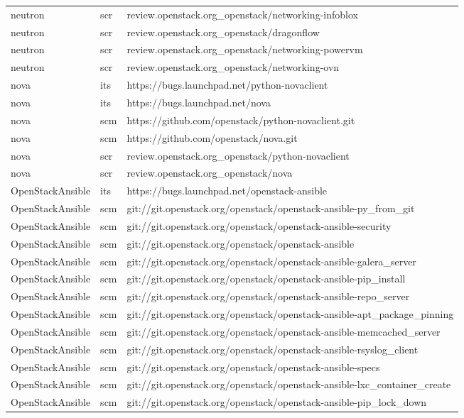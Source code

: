 \begin{center}
\begin{longtable}{|p{4cm}|p{1cm}|p{10cm}|}
neutron&scr&review.openstack.org\_openstack/networking-infoblox\\ 
neutron&scr&review.openstack.org\_openstack/dragonflow\\ 
neutron&scr&review.openstack.org\_openstack/networking-powervm\\ 
neutron&scr&review.openstack.org\_openstack/networking-ovn\\ 
nova&its&https://bugs.launchpad.net/python-novaclient\\ 
nova&its&https://bugs.launchpad.net/nova\\ 
nova&scm&https://github.com/openstack/python-novaclient.git\\ 
nova&scm&https://github.com/openstack/nova.git\\ 
nova&scr&review.openstack.org\_openstack/python-novaclient\\ 
nova&scr&review.openstack.org\_openstack/nova\\ 
OpenStackAnsible&its&https://bugs.launchpad.net/openstack-ansible\\ 
OpenStackAnsible&scm&git://git.openstack.org/openstack/openstack-ansible-py\_from\_git\\ 
OpenStackAnsible&scm&git://git.openstack.org/openstack/openstack-ansible-security\\ 
OpenStackAnsible&scm&git://git.openstack.org/openstack/openstack-ansible\\ 
OpenStackAnsible&scm&git://git.openstack.org/openstack/openstack-ansible-galera\_server\\ 
OpenStackAnsible&scm&git://git.openstack.org/openstack/openstack-ansible-pip\_install\\ 
OpenStackAnsible&scm&git://git.openstack.org/openstack/openstack-ansible-repo\_server\\ 
OpenStackAnsible&scm&git://git.openstack.org/openstack/openstack-ansible-apt\_package\_pinning\\ 
OpenStackAnsible&scm&git://git.openstack.org/openstack/openstack-ansible-memcached\_server\\ 
OpenStackAnsible&scm&git://git.openstack.org/openstack/openstack-ansible-rsyslog\_client\\ 
OpenStackAnsible&scm&git://git.openstack.org/openstack/openstack-ansible-specs\\ 
OpenStackAnsible&scm&git://git.openstack.org/openstack/openstack-ansible-lxc\_container\_create\\ 
OpenStackAnsible&scm&git://git.openstack.org/openstack/openstack-ansible-pip\_lock\_down\\ 

\end{longtable}
\end{center}

